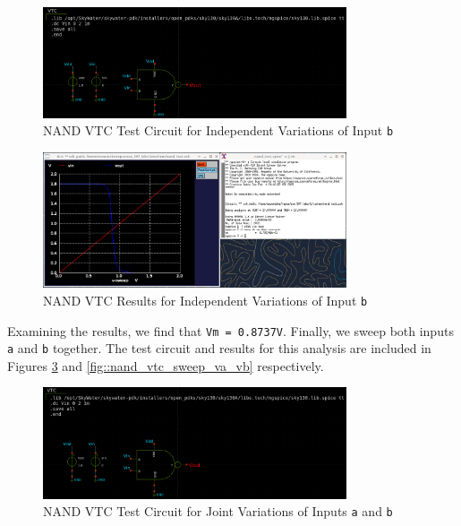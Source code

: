\documentclass[fleqn]{article}
\begin{document}
	\begin{figure}[H]
		\centerline{\includegraphics[width=0.8\textwidth]{nand_vtc_test_sweep_vb.png}}
		\caption{NAND VTC Test Circuit for Independent Variations of Input \texttt{b}}
		\label{fig::nand_vtc_test_sweep_vb}
	\end{figure}
	
	\begin{figure}[H]
		\centerline{\includegraphics[width=0.8\textwidth]{nand_vtc_sweep_vb.png}}
		\caption{NAND VTC Results for Independent Variations of Input \texttt{b}}
		\label{fig::nand_vtc_sweep_vb}
	\end{figure}
	
	Examining the results, we find that \texttt{Vm = 0.8737V}. Finally, we sweep both inputs \texttt{a} and \texttt{b} together. The test circuit and results for this analysis are included in Figures \ref{fig::nand_vtc_test_sweep_va_vb} and \ref{fig::nand_vtc_sweep_va_vb} respectively.
	
	\begin{figure}[H]
		\centerline{\includegraphics[width=0.8\textwidth]{nand_vtc_test_sweep_va_vb.png}}
		\caption{NAND VTC Test Circuit for Joint Variations of Inputs \texttt{a} and \texttt{b}}
		\label{fig::nand_vtc_test_sweep_va_vb}
	\end{figure}
	
\end{document}
